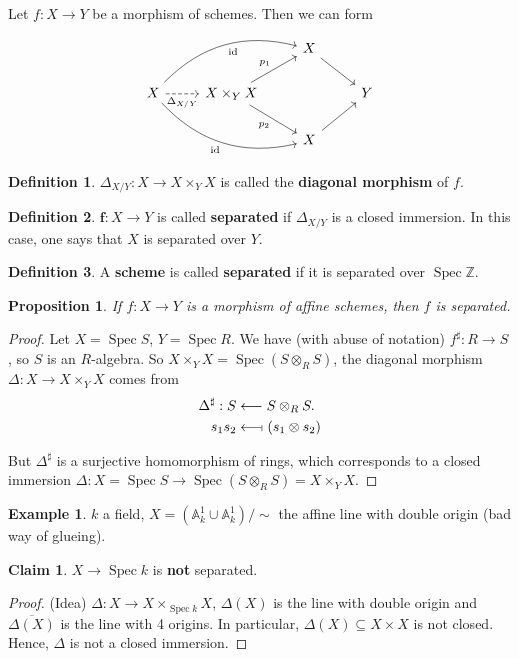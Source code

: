 \documentclass[12pt]{article}
\DeclareMathOperator{\id}{id}
\DeclareMathOperator{\Spec}{Spec}
\newtheorem*{proposition}{Proposition}
\theoremstyle{definition}
\newtheorem*{definition}{Definition}
\newtheorem*{claim}{Claim}
\newtheorem*{example}{Example}
\begin{document}
Let $f:X\rightarrow Y$ be a morphism of schemes. Then we can form
\[\begin{tikzcd}&&X\arrow[rd]\\X\arrow[r,"\Delta_{X/Y}",dashed,swap]\arrow[rru,"\id",swap,bend left]\arrow[rrd,"\id",swap,bend right]&X\times_YX\arrow[ru,"p_1"]\arrow[rd,"p_2",swap]&&Y\\&&X\arrow[ru]\end{tikzcd}\]

\begin{definition}
$\Delta_{X/Y}:X\rightarrow X\times_YX$ is called the \textbf{diagonal morphism} of $f$.
\end{definition}

\begin{definition}
$\boldsymbol f:X\rightarrow Y$ is called \textbf{separated} if $\Delta_{X/Y}$ is a closed immersion. In this case, one says that $X$ is separated over $Y$.
\end{definition}

\begin{definition}
A \textbf{scheme} is called \textbf{separated} if it is separated over $\Spec\mathbb Z$.
\end{definition}

\begin{proposition}
If $f:X\rightarrow Y$ is a morphism of affine schemes, then $f$ is separated.
\end{proposition}

\begin{proof}
Let $X=\Spec S$, $Y=\Spec R$. We have (with abuse of notation) $f^\sharp:R\rightarrow S$, so $S$ is an $R$-algebra. So $X\times_YX=\Spec(S\otimes_RS)$, the diagonal morphism $\Delta:X\rightarrow X\times_YX$ comes from
\begin{align*}
\Delta^\sharp:S&\longleftarrow S\otimes_RS.\\s_1s_2&\longleftarrow\!\shortmid(s_1\otimes s_2)
\end{align*}

But $\Delta^\sharp$ is a surjective homomorphism of rings, which corresponds to a closed immersion $\Delta:X=\Spec S\rightarrow\Spec(S\otimes_RS)=X\times_YX$.
\end{proof}

\begin{example}
$k$ a field, $X=(\mathbb A_k^1\cup\mathbb A_k^1)/\sim$ the affine line with double origin (bad way of glueing).

\begin{claim}
$X\rightarrow\Spec k$ is \textbf{not} separated.
\end{claim}

\begin{proof}
(Idea) $\Delta:X\rightarrow X\times_{\Spec k}X$, $\Delta(X)$ is the line with double origin and $\overline{\Delta(X)}$ is the line with 4 origins. In particular, $\Delta(X)\subseteq X\times X$ is not closed. Hence, $\Delta$ is not a closed immersion.
\end{proof}
\end{example}
\end{document}

